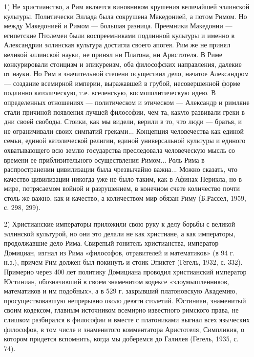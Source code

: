1)  Не христианство,  а  Рим является  виновником крушения  величайшей
эллинской культуры.  Политически Эллада  была сокрушена  Македонией, а
потом  Римом.  Но  между  Македонией  и  Римом  ---  большая  разница.
Преемники  Македонии  ---   египетские  Птолемеи  были  воспреемниками
подлинной культуры и именно  в Александрии эллинская культура достигла
своего  апогея.  Рим   же  не  принял  великой   эллинской  науки,  не
принял  ни Платона,  ни Аристотеля.  В Риме  конкурировали стоицизм  и
эпикуреизм, оба  философских направления, далекие  от науки. Но  Рим в
значительной степени осуществил дело, начатое Александром --- создание
всемирной империи,  выражавшей в грубой, несовершенной  форме подлинно
католическую, т.е. вселенскую,  космополитическую идею. В определенных
отношениях --- политическом и этическом  --- Александр и римляне стали
причиной появления лучшей  философии, чем та, какую  развивали греки в
дни  своей свободы.  Стоики,  как мы  видели, верили  в  то, что  люди
---  братья, и  не  ограничивали своих  симпатий греками...  Концепция
человечества  как единой  семьи, единой  католической религии,  единой
универсальной культуры  и единого охватывающего всю  землю государства
преследовала  человеческую   мысль  со  времени   ее  приблизительного
осуществления Римом...  Роль Рима  в распространении  цивилизации была
чрезвычайно важна...  Можно сказать, что качество  цивилизации никогда
уже не было таким, как в Афинах Перикла, но в мире, потрясаемом войной
и разрушением, в конечном счете количество почти столь же важно, как и
качество, а количеством мир обязан Риму (Б.Рассел, 1959, с. 298, 299).

2) Христианские императоры приложили свою руку к делу борьбы с великой
эллинской  культурой,  но они  это  делали  не  как христиане,  а  как
императоры,  продолжавшие дело  Рима. Свирепый  гонитель христианства,
император  Домициан,   изгнал  из   Рима  «философов,   отравителей  и
математиков» (в  94 г. н.э.), причем  Рим должен был покинуть  и стоик
Эпиктет  (Гегель,  1932, с.  332).  Примерно  через 400  лет  политику
Домициана  проводил христианский  император  Юстиниан, обозначивший  в
своем знаменитом кодексе «злоумышленников, математиков и им подобных»,
а  в   529  г.  закрывший  платоновскую   Академию,  просуществовавшую
непрерывно около девяти столетий. Юстиниан, знаменитый своим кодексом,
главным  источником всемирно  известного  римского  права, не  слишком
разбирался в  философии и вместе  с платониками выгнал  всех языческих
философов,  в   том  числе  и  знаменитого   комментатора  Аристотеля,
Симпликия, о котором придется вспомнить, когда мы доберемся до Галилея
(Гегель, 1935, с. 74).

